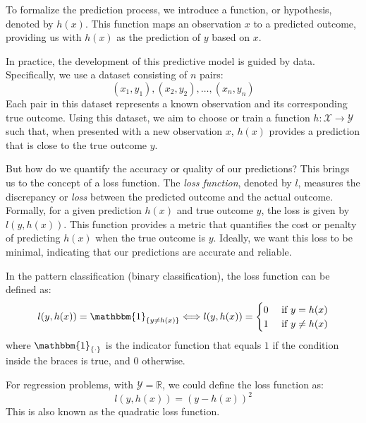 \documentclass[11pt]{article}
\begin{document}
    To formalize the prediction process, we introduce a function, or hypothesis, denoted by $h(x)$. This function maps an observation $x$ to a predicted outcome, providing us with $h(x)$ as the prediction of $y$ based on $x$.

    In practice, the development of this predictive model is guided by data. Specifically, we use a dataset consisting of $n$ pairs:
    $$
    (x_1, y_1), (x_2, y_2), \dots, (x_n, y_n)
    $$
    Each pair in this dataset represents a known observation and its corresponding true outcome. Using this dataset, we aim to choose or train a function $h : \mathcal{X} \rightarrow \mathcal{Y}$ such that, when presented with a new observation $x$, $h(x)$ provides a prediction that is close to the true outcome $y$.

    But how do we quantify the accuracy or quality of our predictions? This brings us to the concept of a loss function. The \textit{loss function}, denoted by $l$, measures the discrepancy or \textit{loss} between the predicted outcome and the actual outcome. Formally, for a given prediction $h(x)$ and true outcome $y$, the loss is given by $l(y, h(x))$. This function provides a metric that quantifies the cost or penalty of predicting $h(x)$ when the true outcome is $y$. Ideally, we want this loss to be minimal, indicating that our predictions are accurate and reliable.

    \begin{example}
        In the pattern classification (binary classification), the loss function can be defined as:
        \begin{equation}
            l(y, h(x)) = \mathbbm{1}_{\{y \neq h(x)\}} \Longleftrightarrow
            l(y, h(x)) = \begin{cases}
                             0 & \text{ if } y = h(x) \\
                             1 & \text{ if } y \neq h(x)
            \end{cases}
        \end{equation}
        where $\mathbbm{1}_{\{ \cdot \}}$ is the indicator function that equals $1$ if the condition inside the braces is true, and $0$ otherwise.

        For regression problems, with $\mathcal{Y} = \mathbb{R}$, we could define the loss function as:
        \begin{equation}
            l(y, h(x)) = (y - h(x))^2
        \end{equation}
        This is also known as the quadratic loss function.
    \end{example}
\end{document}

